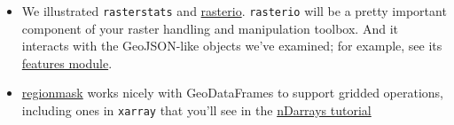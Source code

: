 \documentclass[11pt]{article}
\providecommand{\tightlist}{%
      \setlength{\itemsep}{0pt}\setlength{\parskip}{0pt}}
\begin{document}
\begin{itemize}
  \begin{itemize}
  \tightlist
  \item
    We illustrated \texttt{rasterstats} and
    \href{https://rasterio.readthedocs.io/en/latest/}{rasterio}.
    \texttt{rasterio} will be a pretty important component of your
    raster handling and manipulation toolbox. And it interacts with the
    GeoJSON-like objects we've examined; for example, see its
    \href{https://rasterio.readthedocs.io/en/latest/topics/features.html}{features
    module}.
  \item
    \href{https://regionmask.readthedocs.io/}{regionmask} works nicely
    with GeoDataFrames to support gridded operations, including ones in
    \texttt{xarray} that you'll see in the
    \href{https://geohackweek.github.io/nDarrays/}{nDarrays tutorial}
  \end{itemize}
\end{itemize}


    
    
    
    
\end{document}
